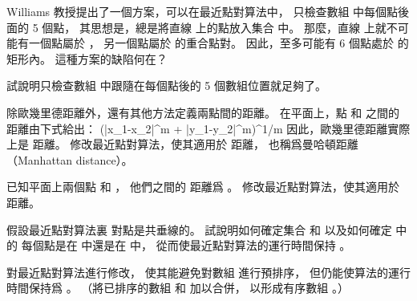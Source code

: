 \startsection[
  title={Finding the closest pair of points},
]

\startEXERCISE
Williams 教授提出了一個方案，可以在最近點對算法中，
只檢查數組  中每個點後面的 5 個點，
其思想是，總是將直線  上的點放入集合  中。
那麼，直線  上就不可能有一個點屬於 ，
另一個點屬於  的重合點對。
因此，至多可能有 6 個點處於 \m{\delta\times 2\delta} 的矩形內。
這種方案的缺陷何在？
\stopEXERCISE

\startANSWER
{}
\stopANSWER

\startEXERCISE
試說明只檢查數組  中跟隨在每個點後的 5 個數組位置就足夠了。
\stopEXERCISE

\startANSWER
{}
\stopANSWER

\startEXERCISE
除歐幾里德距離外，還有其他方法定義兩點間的距離。
在平面上，點  和  之間的{\EMP {} 距離}由下式給出：
\startformula
(|x_1-x_2|^m + |y_1-y_2|^m)^{1/m}
\stopformula
因此，歐幾里德距離實際上是  距離。
修改最近點對算法，使其適用於  距離，
也稱爲{\EMP 曼哈頓距離}（Manhattan distance）。
\stopEXERCISE

\startANSWER
{}
\stopANSWER

\startEXERCISE
已知平面上兩個點  和 ，
他們之間的  距離爲 。
修改最近點對算法，使其適用於  距離。
\stopEXERCISE

\startANSWER
{}
\stopANSWER

\startEXERCISE
假設最近點對算法裏  對點是共垂線的。
試說明如何確定集合  和  以及如何確定  中的
每個點是在  中還是在  中，
從而使最近點對算法的運行時間保持 。
\stopEXERCISE

\startANSWER
{}
\stopANSWER

\startEXERCISE
對最近點對算法進行修改，
使其能避免對數組  進行預排序，
但仍能使算法的運行時間保持爲 。
（\hint 將已排序的數組  和  加以合併，
以形成有序數組 。）
\stopEXERCISE

\startANSWER
{}
\stopANSWER

\stopsection
